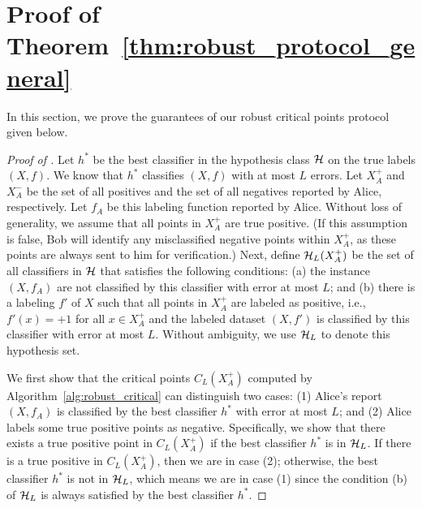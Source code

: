 \section{Proof of Theorem~\ref{thm:robust_protocol_general}}\label{apx:robust_protocol}

In this section, we prove the guarantees of our robust critical points protocol given below.


% 
\begin{proof}[Proof of ]
    Let $h^*$ be the best classifier in the hypothesis class $\mathcal{H}$ on the true labels $(X,f)$. We know that $h^*$ classifies $(X,f)$ with at most $L$ errors.
    Let $X_A^+$ and $X_A^-$ be the set of all positives and the set of all negatives reported by Alice, respectively. Let $f_A$ be this labeling function reported by Alice.
    Without loss of generality, we assume that all points in $X_A^+$ are true positive. 
    (If this assumption is false, Bob will identify any misclassified negative points within $X_A^+$, as these points are always sent to him for verification.)
    Next, define $\mathcal{H}_{L}(X_A^+)$ be the set of all classifiers in $\mathcal{H}$ that satisfies the following conditions: (a) the instance $(X,f_A)$ are not classified by this classifier with error at most $L$; and (b)
    there is a labeling $f'$ of $X$ such that all points in $X_A^+$ are labeled as positive, i.e.,  $f'(x) = +1$ for all $x\in X_A^+$ and the labeled dataset $(X,f')$ is classified by this classifier with error at most $L$. 
    Without ambiguity, we use $\mathcal{H}_L$ to denote this hypothesis set. 
    
    We first show that the critical points $C_{L}(X_A^+)$ computed by Algorithm~\ref{alg:robust_critical} can distinguish two cases: (1) Alice's report $(X,f_A)$ is classified by the best classifier $h^*$ with error at most $L$; and (2) Alice labels some true positive points as negative. 
    Specifically, we show that there exists a true positive point in  $C_{L}(X_A^+)$ if the best classifier $h^*$ is in $\mathcal{H}_L$. If there is a true positive in $C_{L}(X_A^+)$, then we are in case (2); otherwise, the best classifier $h^*$ is not in $\mathcal{H}_L$, which means we are in case (1) since the condition (b) of $\mathcal{H}_L$ is always satisfied by the best classifier $h^*$.
    

\end{proof}
